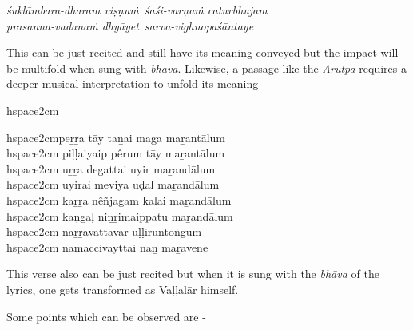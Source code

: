 \begin{myquote}
\textit{śuklāmbara-dharam viṣṇuṁ śaśi-varṇaṁ caturbhujam }\\\textit{prasanna-vadanaṁ dhyāyet sarva-vighnopaśāntaye }
\end{myquote}

This can be just recited and still have its meaning conveyed but the impact will be multifold when sung with \textit{bhāva}. Likewise, a passage like the \textit{Arutpa} requires a deeper musical interpretation to unfold its meaning –

\begin{myquote}
hspace{2cm}
\end{myquote}

\begin{myquote}
hspace{2cm}peṟṟa tāy taṉai maga maṟantālum\\hspace{2cm} piḷḷaiyaip pêrum tāy maṟantālum\\hspace{2cm} uṟṟa degattai uyir maṟandālum\\hspace{2cm} uyirai meviya uḍal maṟandālum\\hspace{2cm} kaṟṟa nêñjagam kalai maṟandālum\\hspace{2cm} kaṇgaḷ niṉṟimaippatu maṟandālum\\hspace{2cm} naṟṟavattavar uḷḷiruntoṅgum\\hspace{2cm} namaccivāyttai nāṉ maṟavene
\end{myquote}

This verse also can be just recited but when it is sung with the \textit{bhāva} of the lyrics, one gets transformed as Vaḷḷalār himself.

Some points which can be observed are -

\vspace{-.3cm}

